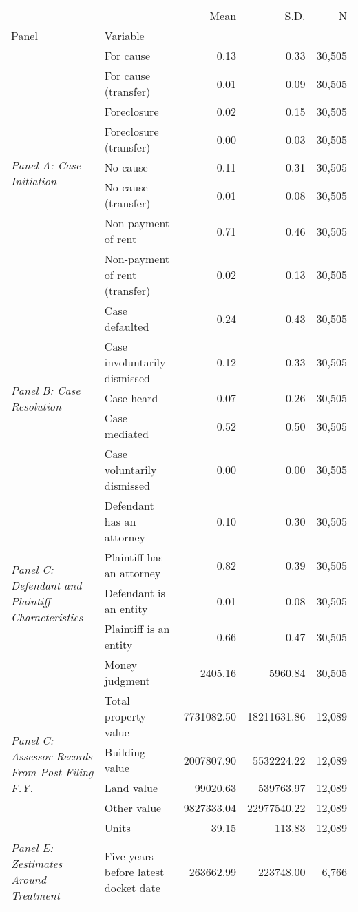 \begin{tabular}{llrrr}
\toprule
 &  & Mean & S.D. & N \\
Panel & Variable &  &  &  \\
\midrule
\multirow[c]{8}{*}{\textit{Panel A: Case Initiation}} & For cause & 0.13 & 0.33 & 30,505 \\
 & For cause (transfer) & 0.01 & 0.09 & 30,505 \\
 & Foreclosure & 0.02 & 0.15 & 30,505 \\
 & Foreclosure (transfer) & 0.00 & 0.03 & 30,505 \\
 & No cause & 0.11 & 0.31 & 30,505 \\
 & No cause (transfer) & 0.01 & 0.08 & 30,505 \\
 & Non-payment of rent & 0.71 & 0.46 & 30,505 \\
 & Non-payment of rent (transfer) & 0.02 & 0.13 & 30,505 \\
\cline{1-5}
\multirow[c]{5}{*}{\textit{Panel B: Case Resolution}} & Case defaulted & 0.24 & 0.43 & 30,505 \\
 & Case involuntarily dismissed & 0.12 & 0.33 & 30,505 \\
 & Case heard & 0.07 & 0.26 & 30,505 \\
 & Case mediated & 0.52 & 0.50 & 30,505 \\
 & Case voluntarily dismissed & 0.00 & 0.00 & 30,505 \\
\cline{1-5}
\multirow[c]{5}{*}{\textit{Panel C: Defendant and Plaintiff Characteristics}} & Defendant has an attorney & 0.10 & 0.30 & 30,505 \\
 & Plaintiff has an attorney & 0.82 & 0.39 & 30,505 \\
 & Defendant is an entity & 0.01 & 0.08 & 30,505 \\
 & Plaintiff is an entity & 0.66 & 0.47 & 30,505 \\
 & Money judgment & 2405.16 & 5960.84 & 30,505 \\
\cline{1-5}
\multirow[c]{5}{*}{\textit{Panel C: Assessor Records From Post-Filing F.Y.}} & Total property value & 7731082.50 & 18211631.86 & 12,089 \\
 & Building value & 2007807.90 & 5532224.22 & 12,089 \\
 & Land value & 99020.63 & 539763.97 & 12,089 \\
 & Other value & 9827333.04 & 22977540.22 & 12,089 \\
 & Units & 39.15 & 113.83 & 12,089 \\
\cline{1-5}
\multirow[c]{9}{*}{\textit{Panel E: Zestimates Around Treatment}} & Five years before latest docket date & 263662.99 & 223748.00 & 6,766 \\

\end{tabular}
